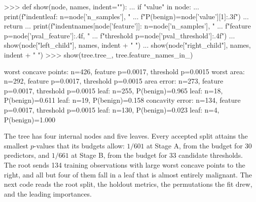 \documentclass[article]{jss}
\begin{document}
\begin{CodeChunk}
\begin{CodeInput}
>>> def show(node, names, indent=""):
...     if "value" in node:
...         print(f"{indent}leaf: n={node['n_samples']}, "
...               f"P(benign)={node['value'][1]:.3f}")
...         return
...     print(f"{indent}{names[node['feature']]}: n={node['n_samples']}, "
...           f"feature p={node['pval_feature']:.4f}, "
...           f"threshold p={node['pval_threshold']:.4f}")
...     show(node["left_child"], names, indent + "  ")
...     show(node["right_child"], names, indent + "  ")
>>> show(tree.tree_, tree.feature_names_in_)
\end{CodeInput}
\begin{CodeOutput}
worst concave points: n=426, feature p=0.0017, threshold p=0.0015
  worst area: n=292, feature p=0.0017, threshold p=0.0015
    area error: n=273, feature p=0.0017, threshold p=0.0015
      leaf: n=255, P(benign)=0.965
      leaf: n=18, P(benign)=0.611
    leaf: n=19, P(benign)=0.158
  concavity error: n=134, feature p=0.0017, threshold p=0.0015
    leaf: n=130, P(benign)=0.023
    leaf: n=4, P(benign)=1.000
\end{CodeOutput}
\end{CodeChunk}
%
The tree has four internal nodes and five leaves. Every accepted split
attains the smallest $p$-values that its budgets allow: $1/601$ at Stage A,
from the  budget for 30 predictors, and $1/661$ at Stage B,
from the budget for 33 candidate thresholds. The root sends 134 training
observations with large worst concave points to the right, and all but four
of them fall in a leaf that is almost entirely malignant. The next code reads
the root split, the holdout metrics, the permutations the fit drew, and the
leading importances.
%
\end{document}
